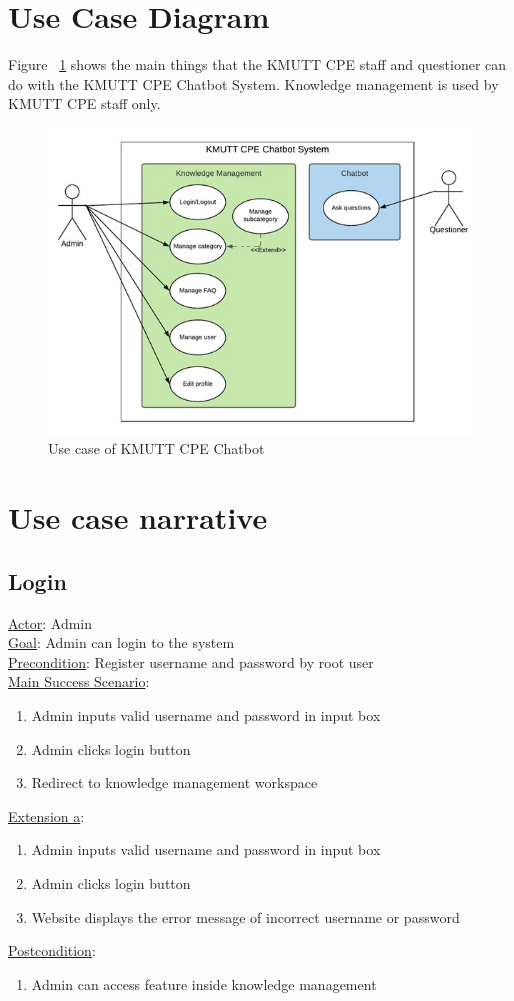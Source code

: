 \documentclass[12pt,oneside,openright,a4paper]{cpe-english-project}
\begin{document}
\section{Use Case Diagram}
Figure ~\ref*{fig:use case diagram} shows the main things that the KMUTT CPE staff and questioner can do with the KMUTT CPE Chatbot System. Knowledge management is used by KMUTT CPE staff only.
\begin{figure}[!h]
	\includegraphics[width=14cm]{img/ch3/use case diagram.jpg}
	\caption{Use case of KMUTT CPE Chatbot}\label{fig:use case diagram}
\end{figure}

\section{Use case narrative}
\subsection{Login}
\underline{Actor}: Admin\\
\underline{Goal}: Admin can login to the system\\
\underline{Precondition}: Register username and password by root user\\
\underline{Main Success Scenario}:
\begin{enumerate}[label={\arabic*.}]
	\item Admin inputs valid username and password in input box        
	\item Admin clicks login button
	\item Redirect to knowledge management workspace
\end{enumerate}
\underline{Extension a}:
\begin{enumerate}[label={\arabic*.}]
	\item Admin inputs valid username and password in input box        
	\item Admin clicks login button
	\item Website displays the error message of incorrect username or password
\end{enumerate}
\underline{Postcondition}: 
\begin{enumerate}[label={\arabic*.}]
	\item Admin can access feature inside knowledge management
\end{enumerate}
\end{document}
